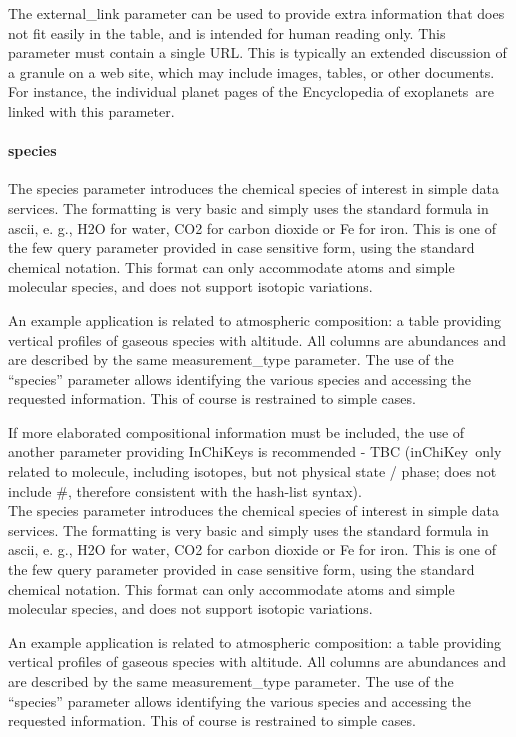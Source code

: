 \documentclass[11pt,a4paper]{ivoa}
\begin{document}
The external\_link parameter can be used to provide extra information that does not fit easily in the table, and is intended for human reading only. This parameter must contain a single URL. This is typically an extended discussion of a granule on a web site, which may include images, tables, or other documents. For instance, the individual planet pages of the Encyclopedia of exoplanets are linked with this parameter.\\

\paragraph{species}

The species parameter introduces the chemical species of interest in simple data services. The formatting is very basic and simply uses the standard formula in ascii, e. g., H2O for water, CO2 for carbon dioxide or Fe for iron. This is one of the few query parameter provided in case sensitive form, using the standard chemical notation. This format can only accommodate atoms and simple molecular species, and does not support isotopic variations.  

An example application is related to atmospheric composition: a table providing vertical profiles of gaseous species with altitude. All columns are abundances and are described by the same measurement\_type parameter. The use of the ``species'' parameter allows identifying the various species and accessing the requested information. This of course is restrained to simple cases.

If more elaborated compositional information must be included, the use of another parameter providing InChiKeys is recommended - TBC (inChiKey only related to molecule, including isotopes, but not physical state / phase; does not include \#, therefore consistent with the hash-list syntax).\\

The species parameter introduces the chemical species of interest in simple data services. The formatting is very basic and simply uses the standard formula in ascii, e. g., H2O for water, CO2 for carbon dioxide or Fe for iron. This is one of the few query parameter provided in case sensitive form, using the standard chemical notation. This format can only accommodate atoms and simple molecular species, and does not support isotopic variations.  

An example application is related to atmospheric composition: a table providing vertical profiles of gaseous species with altitude. All columns are abundances and are described by the same measurement\_type parameter. The use of the ``species'' parameter allows identifying the various species and accessing the requested information. This of course is restrained to simple cases.
\end{document}
